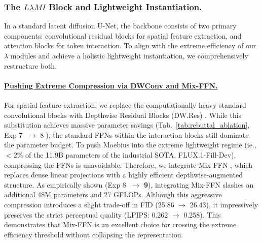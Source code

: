 \documentclass{llmxive}
\begin{document}
\subsubsection{The \texorpdfstring{$L\lambda MI$}{L MI} Block and Lightweight Instantiation.}\label{sec:llm_instantiation}
In a standard latent diffusion U-Net, the backbone consists of two primary components: convolutional residual blocks for spatial feature extraction, and attention blocks for token interaction. To align with the extreme efficiency of our $\lambda$ modules and achieve a holistic lightweight instantiation, we comprehensively restructure both.

\vspace{-0.5em}
\paragraph{\underline{Pushing Extreme Compression via DWConv and Mix-FFN.}}
For spatial feature extraction, we replace the computationally heavy standard convolutional blocks with Depthwise Residual Blocks (DW.Res) \cite{Sandler2018MobileNetV2}. While this substitution achieves massive parameter savings (Tab.~\ref{tab:rebuttal_ablation}, Exp \textcircled{\small 7} $\rightarrow$ \textcircled{\small 8}), the standard FFNs within the interaction blocks still dominate the parameter budget. To push Moebius into the extreme lightweight regime (ie., $<2\%$ of the 11.9B parameters of the industrial SOTA, FLUX.1-Fill-Dev), compressing the FFNs is unavoidable. Therefore, we integrate Mix-FFN \cite{xie2024sana, xie2025sana}, which replaces dense linear projections with a highly efficient depthwise-augmented structure. As empirically shown (Exp \textcircled{\small 8} $\rightarrow$ \textcircled{\small \textbf{9}}), integrating Mix-FFN slashes an additional 48M parameters and 27 GFLOPs. Although this aggressive compression introduces a slight trade-off in FID (25.86 $\rightarrow$ 26.43), it impressively preserves the strict perceptual quality (LPIPS: 0.262 $\rightarrow$ 0.258). This demonstrates that Mix-FFN is an excellent choice for crossing the extreme efficiency threshold without collapsing the representation.

\vspace{-0.5em}
\end{document}
